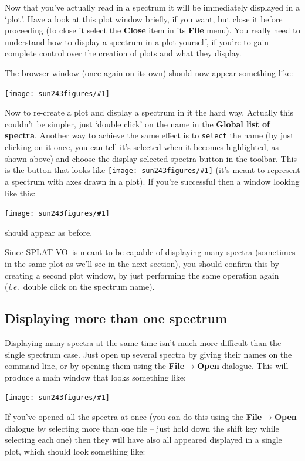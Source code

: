\documentclass[twoside,11pt]{article}
\newcommand{\htmladdimg}[1]{}
\newcommand{\latexhtml}[2]{#1}
\newcommand{\xlabel}[1]{}
\renewcommand{\_}{\texttt{\symbol{95}}}
\newcommand{\SPLAT}{\textsf{SPLAT-VO}}
\newcommand{\mainfigure}[1]
{\begin{center}
 \latexhtml{\texttt{[image: sun243\_figures/\#1]}}{\htmladdimg{#1.gif}}
 \end{center}
}
\newcommand{\inline}[1]
        {\latexhtml{\texttt{[image: sun243\_figures/\#1]}}
        {\htmladdimg[align=center]{#1.gif}}}
\newcommand{\menuitem}[1]{\textbf{#1}}
\newcommand{\submenuitem}[2]{\latexhtml{\textbf{#1$\rightarrow$#2}}{\textbf{#1->#2}}}
\newcommand{\labelitem}[1]{\textbf{#1}}
\newcommand{\hitext}[1]{\texttt{#1}}
\newcommand{\ie}{\textit{i.e.}}
\begin{document}
Now that you've actually read in a spectrum it will be immediately
displayed in a `plot'. Have a look at this plot window briefly, if you
want, but close it before proceeding (to close it select the
\menuitem{Close} item in its \menuitem{File} menu). You really need to
understand how to display a spectrum in a plot yourself, if you're to
gain complete control over the creation of plots and what they
display.

The browser window (once again on its own) should now appear something
like:

\mainfigure{browser2}

Now to re-create a plot and display a spectrum in it the hard
way. Actually this couldn't be simpler, just `double click' on the
name in the \labelitem{Global list of spectra}. Another way to achieve
the same effect is to \hitext{select} the name (by just clicking on it
once, you can tell it's selected when it becomes highlighted, as shown
above) and choose the display selected spectra button in the
toolbar. This is the button that looks like \inline{display} (it's
meant to represent a spectrum with axes drawn in a plot). If you're
successful then a window looking like this:

\mainfigure{plot1}

should appear as before.

Since \SPLAT\ is meant to be capable of displaying many spectra
(sometimes in the same plot as we'll see in the next section), you
should confirm this by creating a second plot window, by just
performing the same operation again (\ie\ double click on the
spectrum name).

\newpage
\subsection{Displaying more than one spectrum\xlabel{displaying_more_than_one_spectrum}}

Displaying many spectra at the same time isn't much more difficult
than the single spectrum case. Just open up several spectra by giving
their names on the command-line, or by opening them using the
\submenuitem{File}{Open} dialogue. This will produce a main window that
looks something like:

\mainfigure{browser3}

If you've opened all the spectra at once (you can do this using the
\submenuitem{File}{Open} dialogue by selecting more than one file --
just hold down the shift key while selecting each one) then they will
have also all appeared displayed in a single plot, which should look
something like:
\end{document}
